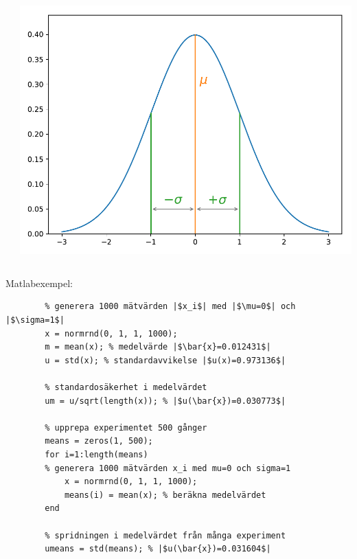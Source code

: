 \documentclass[9pt]{beamer}
\begin{document}
\begin{frame}
\begin{columns}[T]
{\begin{enumerate}
\begin{itemize}
                    \end{itemize}
            \end{enumerate}
            }
            \hspace{-0.2\textwidth}\includegraphics[width=1.2\textwidth]{gaus.pdf}
        \end{columns}
    \end{frame}

    \begin{frame}[fragile]
        Matlabexempel:
        \begin{verbatim}
        % generera 1000 mätvärden |$x_i$| med |$\mu=0$| och |$\sigma=1$|
        x = normrnd(0, 1, 1, 1000);
        m = mean(x); % medelvärde |$\bar{x}=0.012431$|
        u = std(x); % standardavvikelse |$u(x)=0.973136$|

        % standardosäkerhet i medelvärdet
        um = u/sqrt(length(x)); % |$u(\bar{x})=0.030773$|

        % upprepa experimentet 500 gånger
        means = zeros(1, 500);
        for i=1:length(means)
        % generera 1000 mätvärden x_i med mu=0 och sigma=1
            x = normrnd(0, 1, 1, 1000);
            means(i) = mean(x); % beräkna medelvärdet
        end

        % spridningen i medelvärdet från många experiment
        umeans = std(means); % |$u(\bar{x})=0.031604$|
        \end{verbatim}

    \end{frame}
\end{document}
